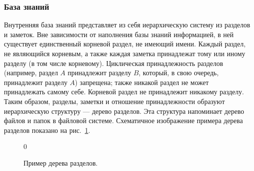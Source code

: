 \subsubsection{База знаний}
    \label{sec:req:fn:kb}
    Внутренняя база знаний представляет из себя иерархическую систему из разделов
    и заметок. Вне зависимости от наполнения базы знаний информацией, в ней существует единственный
    корневой раздел, не имеющий имени. Каждый раздел, не являющийся корневым, а также
    каждая заметка принадлежат тому или иному разделу (в том числе корневому). Циклическая
    принадлежность разделов (например, раздел \(A\) принадлежит разделу \(B\), который, в свою
    очередь, принадлежит разделу \(A\)) запрещена; также никакой раздел не может принадлежать самому
    себе. Корневой раздел не принадлежит никакому разделу. Таким образом, разделы, заметки и отношение
    принадлежности образуют иерархическую структуру --- дерево разделов. Эта структура напоминает
    дерево файлов и папок в файловой системе. Схематичное изображение примера дерева разделов
    показано на рис.~\ref{fig:req:fn:kb:tree}.
    \begin{figure}[h]
        \centering
        \begingroup
        \newlength{\treeindent}
        \newlength{\treeskip}
        \setlength{\treeindent}{2em}
        \setlength{\treeskip}{-3ex}
        \setcounter{treeline}0
        \newcommand{\mypoint}[2]{(#2 * \treeindent, #1 * \treeskip)}
        \newcommand{\outpoint}[2]{(#2 * \treeindent + 0.75em, #1 * \treeskip - 1.5ex)}
        \newcommand{\midpoint}[2]{(#2 * \treeindent + 0.75em, #1 * \treeskip)}
        \newcommand{\inpoint}[2]{(#2 * \treeindent - 0.1em, #1 * \treeskip)}
        \newcommand{\mynode}[2]{
            \node at \mypoint{\thetreeline}{#1} [anchor = west] {#2};%
            \stepcounter{treeline}%
        }
        \endgroup
        \caption{Пример дерева разделов.}
        \label{fig:req:fn:kb:tree}
    \end{figure}

